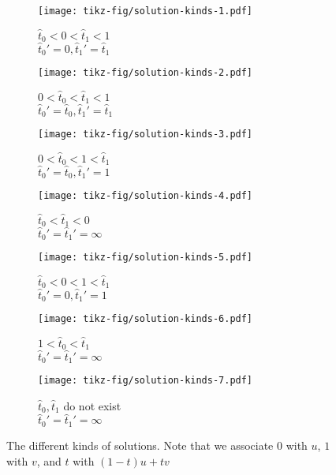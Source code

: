 \begin{figure}
    \centering
    \begin{subfigure}[t]{0.3\textwidth}
      \texttt{[image: tikz-fig/solution-kinds-1.pdf]}
      \caption{\(\hat t_0 < 0 < \hat t_1 < 1\) \\ 
        \(\hat t_0' = 0, \hat t_1' = \hat t_1\)}
    \end{subfigure}
    \hfill
    \begin{subfigure}[t]{0.3\textwidth}
      \texttt{[image: tikz-fig/solution-kinds-2.pdf]}
      \caption{\(0 < \hat t_0 < \hat t_1 < 1\)\\ 
        \(\hat t_0' = \hat t_0, \hat t_1' = \hat t_1\)}
    \end{subfigure}
    \hfill
    \begin{subfigure}[t]{0.3\textwidth}
      \texttt{[image: tikz-fig/solution-kinds-3.pdf]}
      \caption{\(0 < \hat t_0 < 1 < \hat t_1 \) \\
        \(\hat t_0' = \hat t_0, \hat t_1' = 1\)}
    \end{subfigure}

    \begin{subfigure}[t]{0.3\textwidth}
      \texttt{[image: tikz-fig/solution-kinds-4.pdf]}
      \caption{\(\hat t_0 < \hat t_1 < 0\)\\ 
        \(\hat t_0' = \hat t_1' = \infty\)}
    \end{subfigure}
    \hfill
    \begin{subfigure}[t]{0.3\textwidth}
      \texttt{[image: tikz-fig/solution-kinds-5.pdf]}
      \caption{\(\hat t_0 < 0 < 1 < \hat t_1\)\\ 
        \(\hat t_0' = 0, \hat t_1' = 1\)}
    \end{subfigure}
    \hfill
    \begin{subfigure}[t]{0.3\textwidth}
      \texttt{[image: tikz-fig/solution-kinds-6.pdf]}
      \caption{\(1 < \hat t_0 < \hat t_1\)\\ 
        \(\hat t_0' =  \hat t_1' = \infty\)}
    \end{subfigure}

    \begin{subfigure}[t]{0.3\textwidth}
      \texttt{[image: tikz-fig/solution-kinds-7.pdf]}
      \caption{\(\hat t_0, \hat t_1\) do not exist\\ 
        \(\hat t_0' = \hat t_1' = \infty\)}
    \end{subfigure}
    \caption{The different kinds of solutions. Note that we associate \(0\) with \(u\), \(1\) with \(v\), and \(t\) with \((1-t)u + tv\)}
    \label{fig:solution_kinds}
\end{figure}

